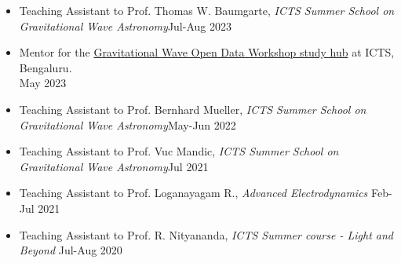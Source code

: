 \begin{itemize}[noitemsep]
\item Teaching Assistant to Prof. Thomas W. Baumgarte, \textit{ICTS Summer School on Gravitational Wave Astronomy}\hfill{Jul-Aug 2023}
\item Mentor for the \href{https://www.icts.res.in/discussion-meeting/gwodw2023}{Gravitational Wave Open Data Workshop study hub} at ICTS, Bengaluru.\\ \hfill{May 2023}
\item Teaching Assistant to Prof. Bernhard Mueller, \textit{ICTS Summer School on Gravitational Wave Astronomy}\hfill{May-Jun 2022}
\item Teaching Assistant to Prof. Vuc Mandic, \textit{ICTS Summer School on Gravitational Wave Astronomy}\hfill{Jul 2021}
\item Teaching Assistant to Prof. Loganayagam R., \textit{Advanced Electrodynamics} \hfill{Feb-Jul 2021}
\item Teaching Assistant to Prof. R. Nityananda, \textit{ICTS Summer course - Light and Beyond} \hfill{Jul-Aug 2020} 
\end{itemize}